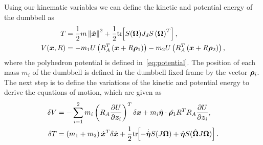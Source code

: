 Using our kinematic variables we can define the kinetic and potential energy of the dumbbell as
\begin{align}\label{eq:kinetic_energy}
    T &= \frac{1}{2} m \left\| \dot{\bm{x}} \right\|^2 + \frac{1}{2} \mathrm{tr}\negthickspace\left[ S(\bm{\Omega}) J_d S\left( \bm{\Omega} \right)^T \right] , \\
    V( \bm{x}, R ) &=  - m_1 U \left( R_A^T \left( \bm{x} + R \bm{\rho}_1 \right) \right) - m_2 U \left( R_A^T \left( \bm{x} + R \bm{\rho}_2 \right) \right) ,
\end{align}
where the polyhedron potential is defined in~\cref{eq:potential}.
The position of each mass \(m_i\) of the dumbbell is defined in the dumbbell fixed frame by the vector \(\bm{\rho}_i\). 
The next step is to define the variations of the kinetic and potential energy to derive the equations of motion, which are given as
\begin{align} 
    \delta V &= -\sum_{i=1}^2  m_i \left( R_A \frac{\partial U}{\partial \bm{z}_i}  \right)^T \delta \bm{x} + m_i \hat{\bm{\eta}}\cdot \hat{\bm{\rho}_1} R^T R_A \frac{\partial U}{\partial \bm{z}_i}, \\
    \delta T &= \left( m_1 + m_2 \right) \dot{\bm{x}}^T \delta \dot{\bm{x}} + \frac{1}{2} \mathrm{tr}\negthickspace\left[ - \dot{\hat{\bm{\eta}}} S(J \bm{\Omega}) + \hat{\bm{\eta}} S(\hat{\bm{\Omega}} J \bm{\Omega}) \right]. 
\end{align}

